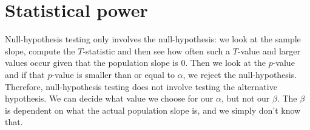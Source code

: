 \documentclass[]{book}\usepackage[]{graphicx}\usepackage[]{color}
\begin{document}
% 
% 
% 
% 
% 
% 
% 
% 
% 
% 
% 
% 
% 
% 
% 
% 
% 
% 
% 
% 
% 


\section{Statistical power}

Null-hypothesis testing only involves the null-hypothesis: we look at the sample slope, compute the $T$-statistic and then see how often such a $T$-value and larger values occur given that the population slope is 0. Then we look at the $p$-value and if that $p$-value is smaller than or equal to $\alpha$, we reject the null-hypothesis. Therefore, null-hypothesis testing does not involve testing the alternative hypothesis. We can decide what value we choose for our $\alpha$, but not our $\beta$. The $\beta$ is dependent on what the actual population slope is, and we simply don't know that.
\end{document}
